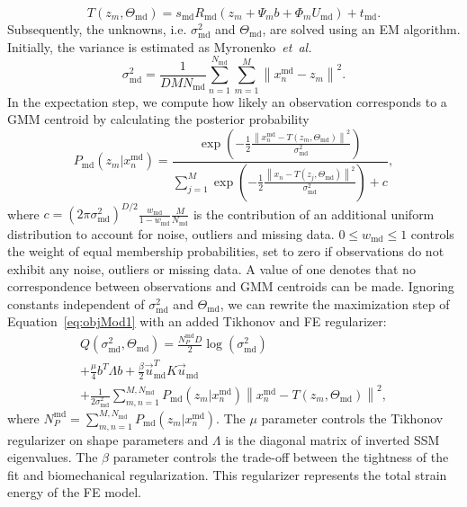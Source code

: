 \documentclass[journal]{IEEEtran}
\newcommand{\trans}[1]{#1^{\scriptscriptstyle T}}
\begin{document}
\begin{equation} \label{eq:concTransform2}
T(z_m,\Theta_\mathrm{md}) = s_\mathrm{md}R_\mathrm{md}(z_m+\Psi_mb+\Phi_mU_\mathrm{md})+t_\mathrm{md}.
\end{equation}
Subsequently, the unknowns, i.e. $\sigma^2_\mathrm{md}$ and $\Theta_\mathrm{md}$, are solved using an EM algorithm. Initially, the variance is estimated as Myronenko~\textit{et~al.}~\cite{Myronenko10a}
\begin{equation} \label{eq:initVariance}
\sigma^2_\mathrm{md} = \frac{1}{DMN_\mathrm{md}}\sum_{n=1}^{N_\mathrm{md}}\sum_{m=1}^{M}\left\|x^{\mathrm{md}}_n-z_m\right\|^2.
\end{equation}
In the expectation step, we compute how likely an observation corresponds to a GMM centroid by calculating the posterior probability
\begin{equation} \label{eq:prob}
P_\mathrm{md}(z_m|x^\mathrm{md}_n) = \frac{\exp{\left(-\frac{1}{2}\frac{\left\|x^\mathrm{md}_n -T(z_m,\Theta_\mathrm{md})\right\|^2}{\sigma^2_\mathrm{md}}\right)}}{\sum_{j=1}^M\exp{\left(-\frac{1}{2}\frac{\left\|x_n -T(z_j,\Theta_\mathrm{md})\right\|^2}{\sigma^2_\mathrm{md}}\right)} + c},
\end{equation}
where $c=(2\pi\sigma^2_\mathrm{md})^{D/2}\frac{w_\mathrm{md}}{1-w_\mathrm{md}}\frac{M}{N_\mathrm{md}}$ is the contribution of an additional uniform distribution to account for noise, outliers and missing data. $0{\leq}w_\mathrm{md}{\leq}1$ controls the weight of equal membership probabilities, set to zero if observations do not exhibit any noise, outliers or missing data. A value of one denotes that no correspondence between observations and GMM centroids can be made. Ignoring constants independent of $\sigma^2_\mathrm{md}$ and $\Theta_\mathrm{md}$, we can rewrite the maximization step of Equation~\eqref{eq:objMod1} with an added Tikhonov and FE regularizer:
\begin{multline} \label{eq:objMod2}
Q(\sigma^2_\mathrm{md},\Theta_\mathrm{md}) = \frac{N^\mathrm{md}_PD}{2}\log(\sigma^2_\mathrm{md})\\
+ \frac{\mu}{4}\trans{b}\Lambda{b} + \frac{\beta}{2}\trans{\vec{u}_\mathrm{md}}K\vec{u}_\mathrm{md}\\
+ \frac{1}{2\sigma^2_\mathrm{md}}\sum_{m,n=1}^{M,N_\mathrm{md}}P_\mathrm{md}(z_m|x^\mathrm{md}_n)\left\|x^\mathrm{md}_n- T(z_m,\Theta_\mathrm{md})\right\|^2,
\end{multline}
where $N^\mathrm{md}_P=\sum_{m,n=1}^{M,N_\mathrm{md}}P_\mathrm{md}(z_m|x^\mathrm{md}_n)$. The $\mu$ parameter controls the Tikhonov regularizer on shape parameters and $\Lambda$ is the diagonal matrix of inverted SSM eigenvalues. The $\beta$ parameter controls the trade-off between the tightness of the fit and biomechanical regularization. This regularizer represents the total strain energy of the FE model. 
\end{document}
